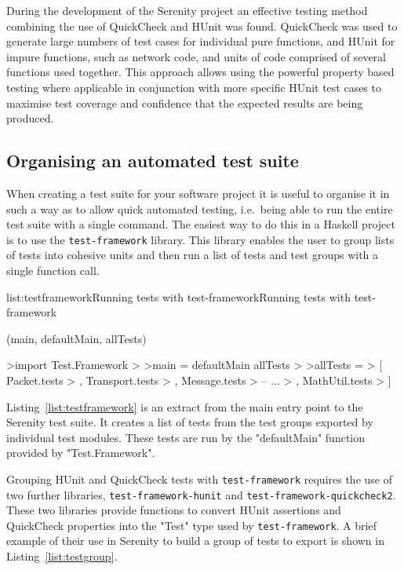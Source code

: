 During the development of the Serenity project an effective testing method combining the
use of QuickCheck and HUnit was found. QuickCheck was used to generate large numbers of
test cases for individual pure functions, and HUnit for impure functions, such as network
code, and units of code comprised of several functions used together. This approach allows
using the powerful property based testing where applicable in conjunction with more specific
HUnit test cases to maximise test coverage and confidence that the expected results are
being produced.


\subsection{Organising an automated test suite}

When creating a test suite for your software project it is useful to organise it in such
a way as to allow quick automated testing, i.e.\ being able to run the entire test suite
with a single command. The easiest way to do this in a Haskell project is to use the
\texttt{test-framework} library. This library enables the user to group lists of tests
into cohesive units and then run a list of tests and test groups with a single function
call.

\vspace{-0.5em}
\begin{listing}{list:testframework}{Running tests with test-framework}{Running tests with test-framework}{}
\end{listing}\vspace{-1.5em}

\functions(main, defaultMain, allTests)
\begin{haskell}
>import Test.Framework
>
>main = defaultMain allTests
>
>allTests =
> [ Packet.tests
> , Transport.tests
> , Message.tests
> -- ...
> , MathUtil.tests
> ]

\end{haskell}
\noindent Listing~\ref{list:testframework} is an extract from the main entry point to
the Serenity test suite. It creates a list of tests from the test groups exported by
individual test modules. These tests are run by the "defaultMain" function provided by
"Test.Framework".

Grouping HUnit and QuickCheck tests with \texttt{test-framework} requires the use of
two further libraries, \texttt{test-framework-hunit} and \texttt{test-framework-quickcheck2}.
These two libraries provide functions to convert HUnit assertions and QuickCheck properties
into the "Test" type used by \texttt{test-framework}. A brief example of their use
in Serenity to build a group of tests to export is shown in Listing~\ref{list:testgroup}.

